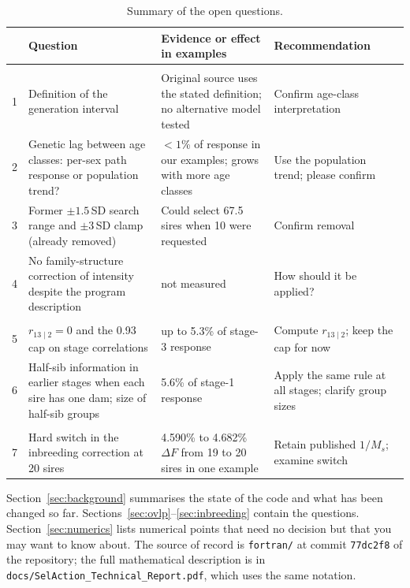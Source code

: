 \documentclass[11pt]{article}
\newcommand{\src}[1]{\texttt{#1}}
\begin{document}
\begin{table}[ht]
\centering\small
\caption{Summary of the open questions.}\label{tab:summary}
\begin{tabular}{>{\raggedright}p{.03\linewidth}>{\raggedright}p{.30\linewidth}>{\raggedright}p{.30\linewidth}>{\raggedright\arraybackslash}p{.27\linewidth}}
\toprule
& Question & Evidence or effect in examples & Recommendation\\\midrule
\multicolumn{4}{l}{\emph{Overlapping generations}}\\
1 & Definition of the generation interval & Original source uses the stated definition; no alternative model tested & Confirm age-class interpretation\\
2 & Genetic lag between age classes: per-sex path response or population trend? & $<1$\% of response in our examples; grows with more age classes & Use the population trend; please confirm\\
3 & Former $\pm1.5$\,SD search range and $\pm3$\,SD clamp (already removed) & Could select 67.5 sires when 10 were requested & Confirm removal\\
4 & No family-structure correction of intensity despite the program description & not measured & How should it be applied?\\
\multicolumn{4}{l}{\emph{Multistage selection}}\\
5 & $r_{13\mid2}=0$ and the 0.93 cap on stage correlations & up to 5.3\% of stage-3 response & Compute $r_{13\mid2}$; keep the cap for now\\
6 & Half-sib information in earlier stages when each sire has one dam; size of half-sib groups & 5.6\% of stage-1 response & Apply the same rule at all stages; clarify group sizes\\
\multicolumn{4}{l}{\emph{Rate of inbreeding}}\\
7 & Hard switch in the inbreeding correction at 20 sires & 4.590\% to 4.682\% $\Delta F$ from 19 to 20 sires in one example & Retain published $1/M_s$; examine switch\\
\bottomrule
\end{tabular}
\end{table}

Section~\ref{sec:background} summarises the state of the code and what has been changed so far. Sections~\ref{sec:ovlp}--\ref{sec:inbreeding} contain the questions. Section~\ref{sec:numerics} lists numerical points that need no decision but that you may want to know about. The source of record is \src{fortran/} at commit \src{77dc2f8} of the repository; the full mathematical description is in \src{docs/SelAction\_Technical\_Report.pdf}, which uses the same notation.
\end{document}
